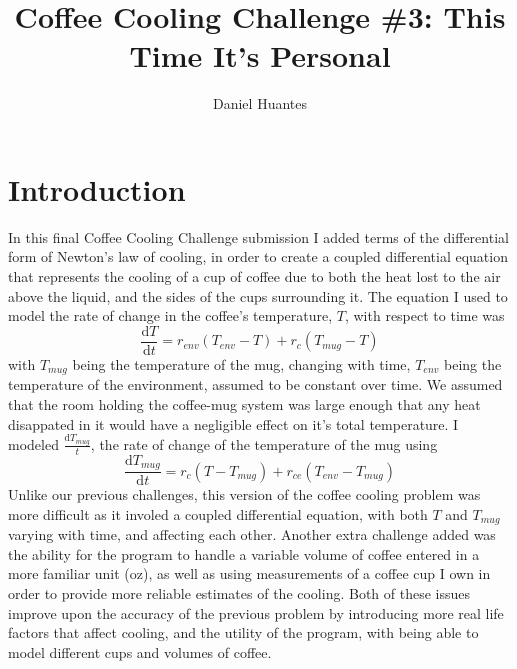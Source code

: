 \documentclass[12pt]{article}
\begin{document}
\title{Coffee Cooling Challenge \#3: This Time It's Personal}
\author{Daniel Huantes}
\twocolumn
\maketitle
\section{Introduction}
In this final Coffee Cooling Challenge submission I added terms of the differential form of Newton's law of cooling, in order to create a coupled differential equation that represents the cooling of a cup of coffee due to both the heat lost to the air above the liquid, and the sides of the cups surrounding it. The equation I used to model the rate of change in the coffee's temperature, $T$, with respect to time was 
\begin{equation}
\frac{\mathrm{d} T}{\mathrm{d} t} = r_{env} (T_{env} - T) + r_{c} (T_{mug} - T)
\end{equation}
with $T_{mug}$ being the temperature of the mug, changing with time, $T_{env}$ being the temperature of the environment, assumed to be constant over time. We assumed that the room holding the coffee-mug system was large enough that any heat disappated in it would have a negligible effect on it's total temperature. I modeled $\frac{\mathrm{d} T_{mug}}{t}$, the rate of change of the temperature of the mug using
\begin{equation}
\frac{\mathrm{d} T_{mug}}{\mathrm{d} t} = r_{c} (T - T_{mug}) + r_{ce} (T_{env} - T_{mug})
\end{equation}
Unlike our previous challenges, this version of the coffee cooling problem was more difficult as it involed a coupled differential equation, with both $T$ and $T_{mug}$ varying with time, and affecting each other. Another extra challenge added was the ability for the program to handle a variable volume of coffee entered in a more familiar unit (oz), as well as using measurements of a coffee cup I own in order to provide more reliable estimates of the cooling. Both of these issues improve upon the accuracy of the previous problem by introducing more real life factors that affect cooling, and the utility of the program, with being able to model different cups and volumes of coffee.
\end{document}
